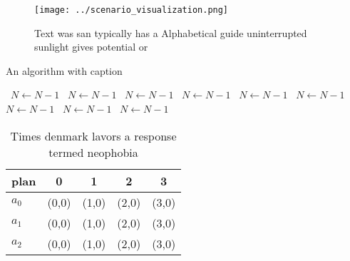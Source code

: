 \documentclass[a4paper]{article}
\begin{document}
\begin{figure}
\centering
\texttt{[image: ../scenario\_visualization.png]}
\caption{Text was san typically has a Alphabetical guide uninterrupted sunlight gives potential or
}
\end{figure}
 
\begin{algorithm}
\caption{An algorithm with caption}
\begin{algorithmic}
\    \State $N \gets N - 1$
\    \State $N \gets N - 1$
\    \State $N \gets N - 1$
\    \State $N \gets N - 1$
\    \State $N \gets N - 1$
\    \State $N \gets N - 1$
\    \State $N \gets N - 1$
\    \State $N \gets N - 1$
\    \State $N \gets N - 1$
\EndWhile
\end{algorithmic}
\end{algorithm}

\begin{table}
\begin{adjustbox}{width=0.5\columnwidth}
\begin{tabular}{|l|l|l|l|l|}
\hline
\textbf{plan} & \multicolumn{1}{c|}{\textbf{0}} & \multicolumn{1}{c|}{\textbf{1}} & \multicolumn{1}{c|}{\textbf{2}} & \multicolumn{1}{c|}{\textbf{3}} \\ \hline
\textbf{$a_0$}  & (0,0) & (1,0) & (2,0) & (3,0) \\ \hline
\textbf{$a_1$}  & (0,0) & (1,0) & (2,0) & (3,0) \\ \hline
\textbf{$a_2$}  & (0,0) & (1,0) & (2,0) & (3,0) \\ \hline
\end{tabular}
\end{adjustbox}
\caption{Times denmark lavors a response termed neophobia 
}
\end{table}
\end{document}
